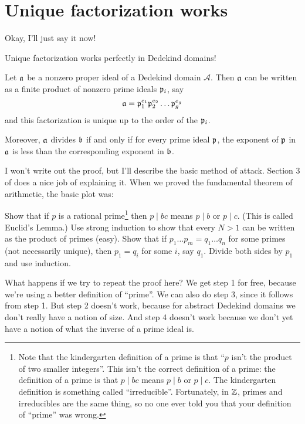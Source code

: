 \section{Unique factorization works}
Okay, I'll just say it now!
\begin{moral}
	Unique factorization works perfectly in Dedekind domains!
\end{moral}
\begin{theorem}
	Let $\mathfrak a$ be a nonzero proper ideal of a Dedekind domain $\mathcal A$.
	Then $\mathfrak a$ can be written as a finite product of nonzero prime ideals $\mathfrak p_i$, say
	\[ \mathfrak a = \mathfrak p_1^{e_1} \mathfrak p_2^{e_2} \dots \mathfrak p_g^{e_g} \]
	and this factorization is unique up to the order of the $\mathfrak p_i$.

	Moreover, $\mathfrak a$ divides $\mathfrak b$ if and only if for every prime ideal $\mathfrak p$,
	the exponent of $\mathfrak p$ in $\mathfrak a$ is less than the corresponding exponent in $\mathfrak b$.
\end{theorem}

I won't write out the proof, but I'll describe the basic method of attack.
Section 3 of \cite{ref:ullery} does a nice job of explaining it.
When we proved the fundamental theorem of arithmetic, the basic plot was:
\begin{enumerate}[(1)]
	\ii Show that if $p$ is a rational prime\footnote{
		Note that the kindergarten definition of a prime is
		that ``$p$ isn't the product of two smaller integers''.
		This isn't the correct definition of a prime:
		the definition of a prime is that $p \mid bc$
		means $p \mid b$ or $p \mid c$.
		The kindergarten definition is something called ``irreducible''.
		Fortunately, in $\mathbb Z$, primes and irreducibles are the same thing,
		so no one ever told you that your definition of ``prime'' was wrong.}
	then $p \mid bc$ means $p \mid b$ or $p \mid c$.  (This is called Euclid's Lemma.)
	\ii Use strong induction to show that every $N > 1$ can be written as the product of primes (easy).
	\ii Show that if $p_1 \dots p_m = q_1 \dots q_n$ for some primes (not necessarily unique),
	then $p_1 = q_i$ for some $i$, say $q_1$.
	\ii Divide both sides by $p_1$ and use induction.
\end{enumerate}
What happens if we try to repeat the proof here?
We get step 1 for free, because we're using a better definition of ``prime''.
We can also do step 3, since it follows from step 1.
But step 2 doesn't work,
because for abstract Dedekind domains
we don't really have a notion of size.
And step 4 doesn't work because we don't yet have a
notion of what the inverse of a prime ideal is.

